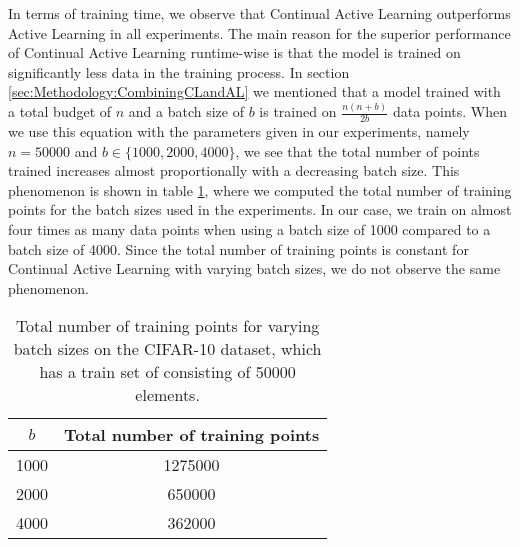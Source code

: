 In terms of training time, we observe that Continual Active Learning outperforms Active Learning in all experiments. The main reason for the superior performance of Continual Active Learning runtime-wise is that the model is trained on significantly less data
in the training process. In section \ref{sec:Methodology:CombiningCLandAL} we mentioned that a model trained with a total budget of $n$ and a batch size of $b$ is trained on $\frac{n(n+b)}{2b}$ data points. When we use this equation with the parameters given in
our experiments, namely $n=50000$ and $b \in \{ 1000, 2000, 4000\}$, we see that the total number of points trained increases almost proportionally with a decreasing batch size. This phenomenon is shown in table \ref{fig:NumberOfTrainingPoints}, where we computed
the total number of training points for the batch sizes used in the experiments. In our case, we train on almost four times as many data points when using a batch size of 1000 compared to a batch size of 4000. Since the total number of training points is constant
for Continual Active Learning with varying batch sizes, we do not observe the same phenomenon. \par

\begin{table}[h]
    \centering
    \begin{tabular}{| c | c |} 
        \hline
        $b$ & Total number of training points \\
        \hline 
        1000 & 1275000 \\
        2000 & 650000 \\
        4000 & 362000 \\
        \hline
    \end{tabular}
    \caption[Total number of data points trained on in the Continual Active Learning experiments]{Total number of training points for varying batch sizes on the CIFAR-10 dataset, which has a train set of consisting of 50000 elements.}
    \label{fig:NumberOfTrainingPoints}
\end{table}

